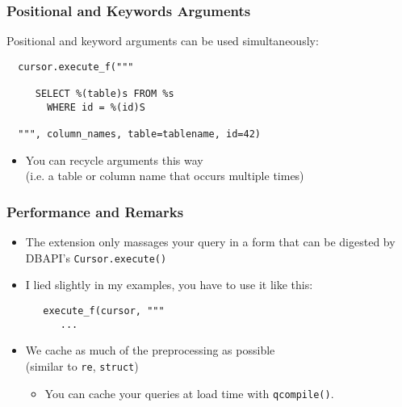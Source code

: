 \documentclass{beamer}
\begin{document}
\begin{frame}[fragile]
  \frametitle{Positional and Keywords Arguments}

  Positional and keyword arguments can be used simultaneously:

\begin{verbatim}
  cursor.execute_f("""

     SELECT %(table)s FROM %s 
       WHERE id = %(id)S

  """, column_names, table=tablename, id=42)
\end{verbatim}

\begin{itemize}
\item You can recycle arguments this way \\
(i.e. a table or column name that occurs multiple times)
\end{itemize}


\end{frame}



\begin{frame}[fragile]
  \frametitle{Performance and Remarks}

  \begin{itemize}
  \item The extension only massages your query in a form that can be digested by
    DBAPI's \texttt{Cursor.execute()}

  \item I lied slightly in my examples, you have to use it like this:
\begin{verbatim}
   execute_f(cursor, """
      ...
\end{verbatim}

  \item We cache as much of the preprocessing as possible \\
(similar to \texttt{re}, \texttt{struct})
    \begin{itemize}
    \item You can cache your queries at load time with \texttt{qcompile()}.
    \end{itemize}
  \end{itemize}


\end{frame}
\end{document}

